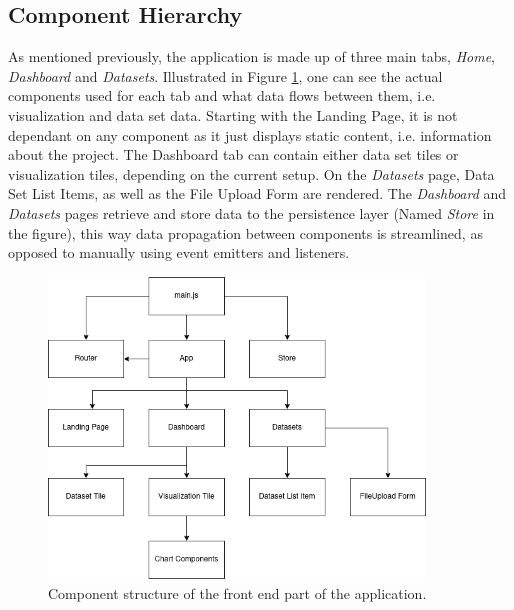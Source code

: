  \subsection{Component Hierarchy}
 As mentioned previously, the application is made up of three main tabs, \emph{Home}, \emph{Dashboard} and \emph{Datasets}. Illustrated in Figure \ref{fig:frontentHierarchy}, one can see the actual components used for each tab and what data flows between them, i.e. visualization and data set data.
Starting with the Landing Page, it is not dependant on any component as it just displays static content, i.e. information about the project. The Dashboard tab can contain either data set tiles or visualization tiles, depending on the current setup. On the \emph{Datasets} page, Data Set List Items, as well as the File Upload Form are rendered. The \emph{Dashboard} and \emph{Datasets} pages retrieve and store data to the persistence layer (Named \emph{Store} in the figure), this way data propagation between components is streamlined, as opposed to manually using event emitters and listeners.

\begin{figure}
    \centering
    \includegraphics[width=10cm]{images/frontend_hierarchy.png}
    \caption{Component structure of the front end part of the application.}
    \label{fig:frontentHierarchy}
\end{figure}